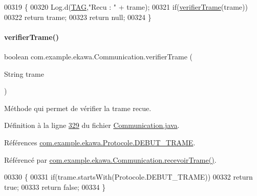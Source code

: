 \begin{DoxyCode}
00319     \{
00320         Log.d(\hyperlink{classcom_1_1example_1_1ekawa_1_1_communication_af355bac38153a4e6d1cda0b3e74bc1c7}{TAG},\textcolor{stringliteral}{"Recu : "} + trame);
00321         \textcolor{keywordflow}{if}(\hyperlink{classcom_1_1example_1_1ekawa_1_1_communication_a6421eb8129e103841f088870610b1b33}{verifierTrame}(trame))
00322             \textcolor{keywordflow}{return} trame;
00323         \textcolor{keywordflow}{return} null;
00324     \}
\end{DoxyCode}
\mbox{\label{classcom_1_1example_1_1ekawa_1_1_communication_a6421eb8129e103841f088870610b1b33}} 
\paragraph{\texorpdfstring{verifier\+Trame()}{verifierTrame()}}
{\footnotesize\ttfamily boolean com.\+example.\+ekawa.\+Communication.\+verifier\+Trame (\begin{DoxyParamCaption}\item[{String}]{trame }\end{DoxyParamCaption})\hspace{0.3cm}{\ttfamily [private]}}



Méthode qui permet de vérifier la trame recue. 



Définition à la ligne \hyperlink{_communication_8java_source_l00329}{329} du fichier \hyperlink{_communication_8java_source}{Communication.\+java}.



Références \hyperlink{_protocole_8java_source_l00025}{com.\+example.\+ekawa.\+Protocole.\+D\+E\+B\+U\+T\+\_\+\+T\+R\+A\+ME}.



Référencé par \hyperlink{_communication_8java_source_l00318}{com.\+example.\+ekawa.\+Communication.\+recevoir\+Trame()}.


\begin{DoxyCode}
00330     \{
00331         \textcolor{keywordflow}{if}(trame.startsWith(Protocole.DEBUT\_TRAME))
00332             \textcolor{keywordflow}{return} \textcolor{keyword}{true};
00333         \textcolor{keywordflow}{return} \textcolor{keyword}{false};
00334     \}
\end{DoxyCode}


